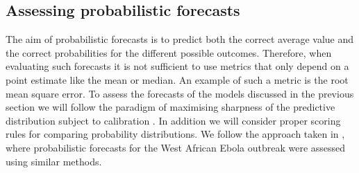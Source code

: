\documentclass[12pt]{article}
\begin{document}
\subsection{Assessing probabilistic forecasts}

The aim of probabilistic forecasts is to predict both the correct average value and the correct probabilities for the different possible outcomes. Therefore, when evaluating such forecasts it is not sufficient to use metrics that only depend on a point estimate like the mean or median. An example of such a metric is the root mean square error. To assess the forecasts of the models discussed in the previous section we will follow the paradigm of maximising sharpness of the predictive distribution subject to calibration \cite{gneitingProbabilisticForecastsCalibration2007}. In addition we will consider proper scoring rules for comparing probability distributions. We follow the approach taken in \cite{funkAssessingPerformanceRealtime2019}, where probabilistic forecasts for the West African Ebola outbreak were assessed using similar methods.
\end{document}
